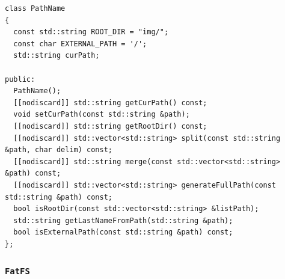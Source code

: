 \documentclass[
    12pt,				%
    oneside,   	        %
    a4paper,			%
    english,			%
    french,				%
    spanish,			%
    brazil,				%
    ]{pacotes/abntex2}
\begin{document}
\begin{lstlisting}[caption={Classe para manipulação de caminhos no sistema}, label={lst:pathname}]
class PathName
{
  const std::string ROOT_DIR = "img/";
  const char EXTERNAL_PATH = '/';
  std::string curPath;

public:
  PathName();
  [[nodiscard]] std::string getCurPath() const;
  void setCurPath(const std::string &path);
  [[nodiscard]] std::string getRootDir() const;
  [[nodiscard]] std::vector<std::string> split(const std::string &path, char delim) const;
  [[nodiscard]] std::string merge(const std::vector<std::string> &path) const;
  [[nodiscard]] std::vector<std::string> generateFullPath(const std::string &path) const;
  bool isRootDir(const std::vector<std::string> &listPath);
  std::string getLastNameFromPath(std::string &path);
  bool isExternalPath(const std::string &path) const;
};
\end{lstlisting}

\subsubsection{\texttt{FatFS}}
\label{subsubsec:fatfs}
\end{document}
